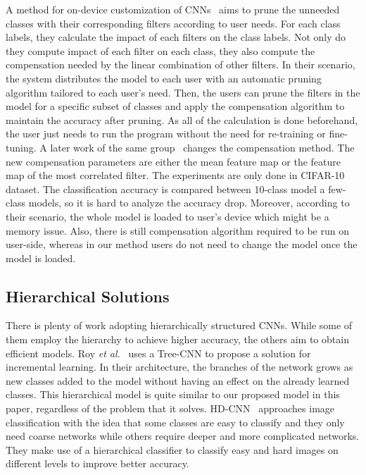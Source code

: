 A method for on-device customization of CNNs~\cite{guo2017pruning2} aims to prune the unneeded classes with their corresponding filters according to user needs. 
For each class labels, they calculate the impact of each filters on the class labels. 
Not only do they compute impact of each filter on each class, they also compute the compensation needed by the linear combination of other filters.
In their scenario, the system distributes the model to each user with an automatic pruning algorithm tailored to each user's need. 
Then, the users can prune the filters in the model for a specific subset of classes and apply the compensation algorithm to maintain the accuracy after pruning. 
As all of the calculation is done beforehand, the user just needs to run the program without the need for re-training or fine-tuning.
A later work of the same group~\cite{guo2017pruning} changes the compensation method.
The new compensation parameters are either the mean feature map or the feature map of the most correlated filter.
The experiments are only done in CIFAR-10 dataset. The classification accuracy is compared between 10-class model a few-class models, so it is hard to analyze the accuracy drop.
Moreover, according to their scenario, the whole model is loaded to user's device which might be a memory issue.
Also, there is still compensation algorithm required to be run on user-side, whereas in our method users do not need to change the model once the model is loaded.

\subsection{Hierarchical Solutions}

There is plenty of work adopting hierarchically structured CNNs. 
While some of them employ the hierarchy to achieve higher accuracy, the others aim to obtain efficient models.
Roy \emph{et al.}~\cite{roy2018tree} uses a Tree-CNN to propose a solution for incremental learning. 
In their architecture, the branches of the network grows as new classes added to the model without having an effect on the already learned classes. 
This hierarchical model is quite similar to our proposed model in this paper, regardless of the problem that it solves. 
HD-CNN~\cite{Yan_2015_ICCV} approaches image classification with the idea that some classes are easy to classify and they only need coarse networks while others require deeper and more complicated networks. 
They make use of a hierarchical classifier to classify easy and hard images on different levels to improve better accuracy. 

